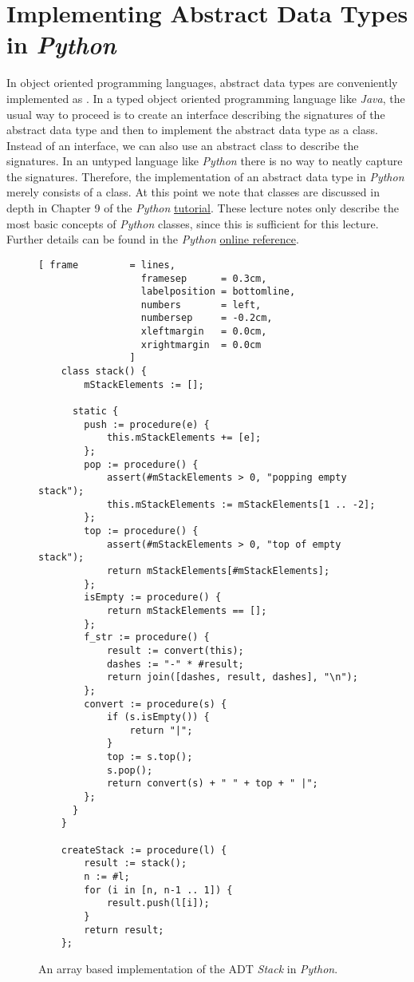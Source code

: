 \section[Implementation]{Implementing Abstract Data Types in \textsl{Python}}
In object oriented programming languages, abstract data types are conveniently implemented as
.  In a typed object oriented programming language like \textsl{Java}, the usual way to proceed
is to create an interface describing the signatures of the abstract data type and then to implement
the abstract data type as a class.  Instead of an interface, we can also use an abstract class
to describe the signatures.  In an untyped language like \textsl{Python} there is no way to
neatly capture the signatures.  Therefore, the implementation of an abstract data type in
\textsl{Python} merely consists of a class.  At this point we note that classes are discussed in depth in
Chapter 9 of the \textsl{Python}  \href{https://docs.python.org/3.6/tutorial/classes.html}{tutorial}.  These
lecture notes only describe the most basic concepts of \textsl{Python} classes, since this is sufficient for this
lecture.  Further details can be found in the \textsl{Python}
\href{https://docs.python.org/3.6/reference/index.html}{online reference}. 


\begin{figure}[!h]
  \centering
\begin{Verbatim}[ frame         = lines, 
                  framesep      = 0.3cm, 
                  labelposition = bottomline,
                  numbers       = left,
                  numbersep     = -0.2cm,
                  xleftmargin   = 0.0cm,
                  xrightmargin  = 0.0cm
                ]
    class stack() {
        mStackElements := [];
    
      static {  
        push := procedure(e) {
            this.mStackElements += [e];
        };
        pop := procedure() {
            assert(#mStackElements > 0, "popping empty stack");
            this.mStackElements := mStackElements[1 .. -2];
        };
        top := procedure() {
            assert(#mStackElements > 0, "top of empty stack");
            return mStackElements[#mStackElements];
        };
        isEmpty := procedure() {
            return mStackElements == [];
        };
        f_str := procedure() {
            result := convert(this);
            dashes := "-" * #result;
            return join([dashes, result, dashes], "\n");
        };
        convert := procedure(s) {
            if (s.isEmpty()) {
                return "|";
            } 
            top := s.top();
            s.pop();
            return convert(s) + " " + top + " |";
        };
      }
    }
    
    createStack := procedure(l) {
        result := stack();
        n := #l;
        for (i in [n, n-1 .. 1]) {
            result.push(l[i]);
        }
        return result;
    };
\end{Verbatim}
\vspace*{-0.3cm}
  \caption{An array based implementation of the ADT \textsl{Stack} in \textsl{Python}.}
  \label{fig:stack-array.stlx}
\end{figure} 

